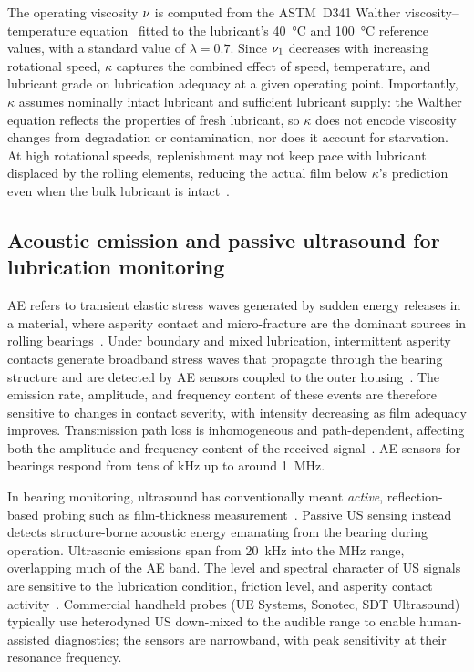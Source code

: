The operating viscosity $\nu$ is computed from the ASTM~D341 Walther viscosity--temperature equation~\cite{astm_d341} fitted to the lubricant's \SI{40}{\celsius} and \SI{100}{\celsius} reference values, with a standard value of $\lambda=0.7$. Since $\nu_1$ decreases with increasing rotational speed, $\kappa$ captures the combined effect of speed, temperature, and lubricant grade on lubrication adequacy at a given operating point. Importantly, $\kappa$ assumes nominally intact lubricant and sufficient lubricant supply: the Walther equation reflects the properties of fresh lubricant, so $\kappa$ does not encode viscosity changes from degradation or contamination, nor does it account for starvation. At high rotational speeds, replenishment may not keep pace with lubricant displaced by the rolling elements, reducing the actual film below $\kappa$'s prediction even when the bulk lubricant is intact~\cite{poll_starved_2019}.

\subsection{Acoustic emission and passive ultrasound for lubrication monitoring}
\label{subsec:origins}
AE refers to transient elastic stress waves generated by sudden energy releases in a material, where asperity contact and micro-fracture are the dominant sources in rolling bearings~\cite{renhart_ae_2021,miettinen_analysis_2001}. Under boundary and mixed lubrication, intermittent asperity contacts generate broadband stress waves that propagate through the bearing structure and are detected by AE sensors coupled to the outer housing~\cite{cornel_condition_2021,renhart_ae_2021}. The emission rate, amplitude, and frequency content of these events are therefore sensitive to changes in contact severity, with intensity decreasing as film adequacy improves. Transmission path loss is inhomogeneous and path-dependent, affecting both the amplitude and frequency content of the received signal~\cite{vallen_sensor_preamplifier_2021}. AE sensors for bearings respond from tens of kHz up to around \SI{1}{MHz}.

In bearing monitoring, ultrasound has conventionally meant \emph{active}, reflection-based probing such as film-thickness measurement~\cite{wang_advanced_2024}. Passive US sensing instead detects structure-borne acoustic energy emanating from the bearing during operation. Ultrasonic emissions span from 20~kHz into the MHz range, overlapping much of the AE band. The level and spectral character of US signals are sensitive to the lubrication condition, friction level, and asperity contact activity~\cite{jakobsen_detecting_2023,lineham_ultrasonic_2008}. Commercial handheld probes (UE Systems, Sonotec, SDT Ultrasound) typically use heterodyned US down-mixed to the audible range to enable human-assisted diagnostics; the sensors are narrowband, with peak sensitivity at their resonance frequency.

